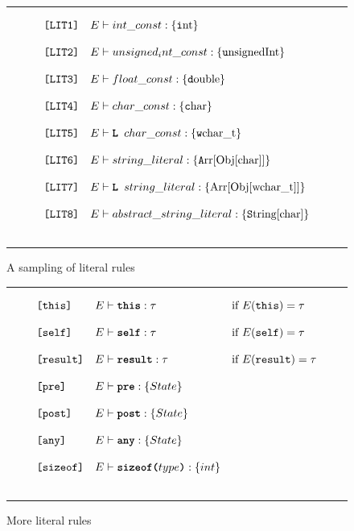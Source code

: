 \documentclass[12pt]{article} %
\newcommand{\reserved}[1]{\textbf{\texttt{#1}}} %
\newcommand{\RULELAB}[1]{\texttt{#1}}
\newcommand{\UNSPACEFORBOX}{\vspace{-2ex}}
\newcommand{\HLINE}{\UNSPACEFORBOX%
\begin{flushleft}\rule{\textwidth}{0.01in}\end{flushleft}%
\UNSPACEFORBOX}
\newenvironment{BFIGURE}{

\begin{figure}
\small
\HLINE
}{
\HLINE
\normalsize
\end{figure}
}
\begin{document}
\label{literalrules}
\begin{BFIGURE}
\begin{displaymath}
\begin{array}{lll}
\RULELAB{[LIT1]} &
E \vdash int\_const:\{\mbox{\texttt int}\}
\\
~\\
\RULELAB{[LIT2]} &
E \vdash unsigned_ int\_const:\{\mbox{\texttt unsignedInt}\}
\\
~\\
\RULELAB{[LIT3]} &
E \vdash float\_const:\{\mbox{\texttt double}\}
\\
~\\
\RULELAB{[LIT4]} &
E \vdash char\_const:\{\mbox{\texttt char}\}
\\
~\\
\RULELAB{[LIT5]} &
E \vdash \mbox{\reserved{L }}char\_const:\{\mbox{\texttt wchar\_t}\}
\\
~\\
\RULELAB{[LIT6]} &
E \vdash string\_literal:\{\mbox{\texttt Arr[Obj[char]]}\}
\\
~\\
\RULELAB{[LIT7]} &
E \vdash \mbox{\reserved{L }}string\_literal:\{\mbox{Arr[Obj[wchar\_t]]}\}
\\
~\\
\RULELAB{[LIT8]} &
E \vdash abstract\_string\_literal:\{\mbox{\texttt String[char]}\}
\\
~\\
\end{array}
\end{displaymath}
\caption{A sampling of literal rules}
\label{fig-lit}
\end{BFIGURE}
\begin{BFIGURE}
\begin{displaymath}
\begin{array}{lll}
\RULELAB{[this]} &
E \vdash \mbox{\reserved{this}}:\tau
&
\mbox{if $E(\mbox{\tt this}) = \tau$}
\\
~\\
\RULELAB{[self]} &
E \vdash \mbox{\reserved{self}}:\tau
&
\mbox{if $E(\mbox{\tt self}) = \tau$}
\\
~\\
\RULELAB{[result]} &
E \vdash \mbox{\reserved{result}}:\tau
&
\mbox{if $E(\mbox{\texttt{result}}) = \tau$}
\\
~\\
\RULELAB{[pre]} &
E \vdash \mbox{\reserved{pre}}:\{State\}
\\
~\\
\RULELAB{[post]} &
E \vdash \mbox{\reserved{post}}:\{State\}
\\
~\\
\RULELAB{[any]} &
E \vdash \mbox{\reserved{any}}:\{State\}
\\
~\\
\RULELAB{[sizeof]} &
E \vdash \mbox{\reserved{sizeof(}}type\mbox{\reserved{)}}:\{int\}
\\
~\\
\end{array}
\end{displaymath}
\caption{More literal rules}
\label{fig-cpplit}
\end{BFIGURE}
\end{document}
